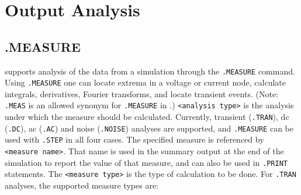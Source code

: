 \section{Output Analysis}
\label{Output_Analysis}

\subsection{.MEASURE}
 
\Xyce{} supports analysis of the data from a simulation through the
\texttt{.MEASURE} command.  Using \texttt{.MEASURE} one can locate extrema in a
voltage or current node, calculate integrals, derivatives, Fourier transforms,
and locate transient events. (Note: \texttt{.MEAS} is an allowed synonym for 
\texttt{.MEASURE} in \Xyce{}.)
\texttt{<analysis type>} is the analysis under which the measure should be calculated.  
Currently,  transient (\texttt{.TRAN}), dc (\texttt{.DC}), ac (\texttt{.AC})
and noise (\texttt{.NOISE}) analyses
are supported, and \texttt{.MEASURE} can be used with \texttt{.STEP} in all four cases.
The specified measure is referenced by \texttt{<measure name>}.  That name is used 
in the summary output at the end of the simulation to report the value of that
measure, and can also be used in \texttt{.PRINT} statements.  The
\texttt{<measure type>} is the type of calculation to be done.  For \texttt{.TRAN}
analyses, the supported measure types are:
